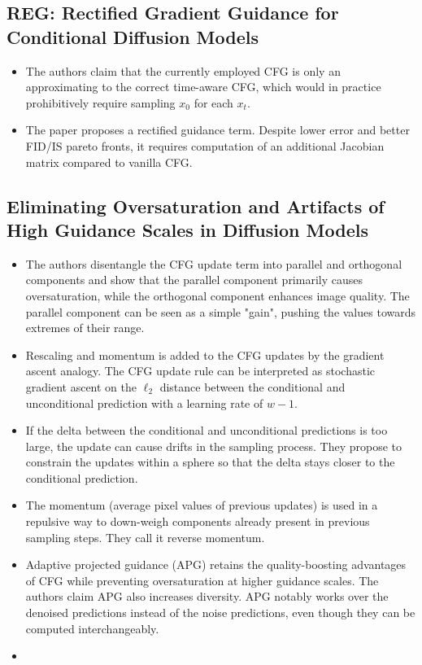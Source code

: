 \documentclass{article}
\begin{document}
\subsection{REG: Rectified Gradient Guidance for Conditional Diffusion Models}


\begin{itemize}
    \item The authors claim that the currently employed CFG is only an approximating to the correct time-aware CFG, which would in practice prohibitively require sampling $x_0$ for each $x_t$.
    \item The paper proposes a rectified guidance term. Despite lower error and better FID/IS pareto fronts, it requires computation of an additional Jacobian matrix compared to vanilla CFG.
\end{itemize}

\subsection{Eliminating Oversaturation and Artifacts of High Guidance Scales in Diffusion Models}


\begin{itemize}
    \item The authors disentangle the CFG update term into parallel and orthogonal components and show that the parallel component primarily causes oversaturation, while the orthogonal component enhances image quality. The parallel component can be seen as a simple "gain", pushing the values towards extremes of their range. 
    \item Rescaling and momentum is added to the CFG updates by the gradient ascent analogy. The CFG update rule can be interpreted as stochastic gradient ascent on the $\ell_2$ distance between the conditional and unconditional prediction with a learning rate of $w-1$.
    \item If the delta between the conditional and unconditional predictions is too large, the update can cause drifts in the sampling process. They propose to constrain the updates within a sphere so that the delta stays closer to the conditional prediction. 
    \item The momentum (average pixel values of previous updates) is used in a repulsive way to down-weigh components already present in previous sampling steps. They call it reverse momentum. 
    \item Adaptive projected guidance (APG) retains the quality-boosting advantages of CFG while preventing oversaturation at higher guidance scales. The authors claim APG also increases diversity. APG notably works over the denoised predictions instead of the noise predictions, even though they can be computed interchangeably.
    \item 
\end{itemize}
\end{document}
